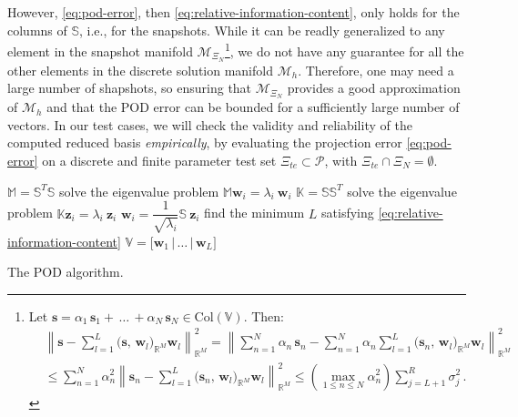 \documentclass[12pt, a4paper, twoside, openright]{report}
\numberwithin{equation}{chapter}
\theoremstyle{theorem}
\theoremstyle{definition}
\theoremstyle{remark}
\theoremstyle{proposition}
\numberwithin{figure}{chapter}
\newcommand{\norm}[1]{\left\lVert#1\right\rVert}
\begin{document}
		However, \eqref{eq:pod-error}, then \eqref{eq:relative-information-content}, only holds for the columns of $\mathbb{S}$, i.e., for the snapshots. While it can be readly generalized to any element in the snapshot manifold $\mathcal{M}_{\Xi_N}$\footnote{
		Let $\mathbf{s} = \alpha_1 \, \mathbf{s}_1 + \, \ldots \, + \alpha_N \, \mathbf{s}_N \in \text{Col}(\mathbb{V})$. Then:
		\begin{equation*}
			\begin{aligned}
				& \norm{\mathbf{s} - \sum_{l = 1}^L \big( \mathbf{s}, \, \mathbf{w}_l \big)_{\mathbb{R}^M} \mathbf{w}_l}_{\mathbb{R}^M}^2 = \norm{\sum_{n = 1}^N \alpha_n \, \mathbf{s}_n - \sum_{n = 1}^N \alpha_n \sum_{l = 1}^L \big( \mathbf{s}_n, \, \mathbf{w}_l \big)_{\mathbb{R}^M} \mathbf{w}_l}_{\mathbb{R}^M}^2 \\
				& \leq \sum_{n = 1}^N \alpha_n^2 \norm{\mathbf{s}_n - \sum_{l = 1}^L \big( \mathbf{s}_n, \, \mathbf{w}_l \big)_{\mathbb{R}^M} \mathbf{w}_l}_{\mathbb{R}^M}^2 \leq \left( \max_{1 \leq n \leq N} \alpha_n^2 \right) \sum_{j = L+1}^R \sigma_j^2 \, .
			\end{aligned}
		\end{equation*}}, we do not have any guarantee for all the other elements in the discrete solution manifold $\mathcal{M}_h$. Therefore, one may need a large number of shapshots, so ensuring that $\mathcal{M}_{\Xi_N}$ provides a good approximation of $\mathcal{M}_h$ and that the POD error can be bounded for a sufficiently large number of vectors. In our test cases, we will check the validity and reliability of the computed reduced basis \emph{empirically}, by evaluating the projection error \eqref{eq:pod-error} on a discrete and finite parameter test set $\Xi_{te} \subset \mathcal{P}$, with $\Xi_{te} \cap \Xi_N = \emptyset$.
		
		\begin{algorithm}[H]	
			\begin{algorithmic}[1]
						\State $\mathbb{M} = \mathbb{S}^T \mathbb{S}$
							\State solve the eigenvalue problem $\mathbb{M} \mathbf{w}_i = \lambda_i ~ \mathbf{w}_i$
						\EndFor
					\Else
						\State $\mathbb{K} = \mathbb{S} \mathbb{S}^T$
							\State solve the eigenvalue problem $\mathbb{K} \mathbf{z}_i = \lambda_i ~ \mathbf{z}_i$
							\State $\mathbf{w}_i = \dfrac{1}{\sqrt{\lambda_i}} \mathbb{S} ~ \mathbf{z}_i$
						\EndFor
					\EndIf
					\State find the minimum $L$ satisfying \eqref{eq:relative-information-content}
					\State $\mathbb{V} = \big[ \mathbf{w}_1 \, \big| \, \ldots \, \big| \, \mathbf{w}_L \big]$
				\EndFunction
			\end{algorithmic}
			
			\caption{The POD algorithm.}
			\label{alg:pod}
		\end{algorithm}
		
\end{document}
